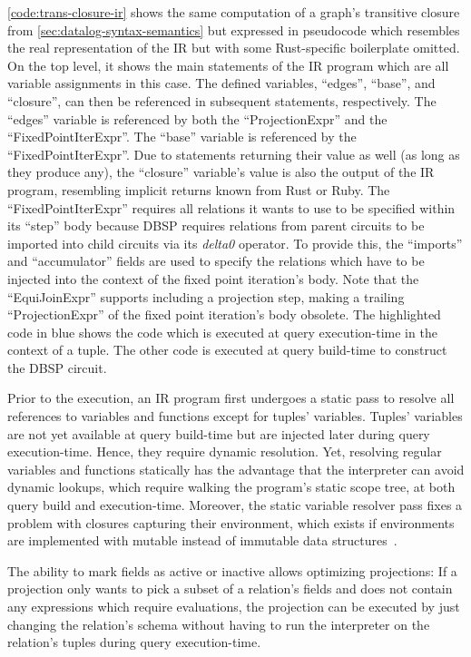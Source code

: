 

\ref{code:trans-closure-ir} shows the same computation of a graph's transitive
closure from \ref{sec:datalog-syntax-semantics} but expressed in pseudocode which
resembles the real representation of the \ac{IR} but with some Rust-specific
boilerplate omitted.
On the top level, it shows the main statements of the \ac{IR} program which
are all variable assignments in this case.
The defined variables, ``edges'', ``base'', and ``closure'', can then be referenced
in subsequent statements, respectively.
The ``edges'' variable is referenced by both the ``ProjectionExpr'' and the
``FixedPointIterExpr''.
The ``base'' variable is referenced by the ``FixedPointIterExpr''.
Due to statements returning their value as well (as long as they produce any),
the ``closure'' variable's value is also the output of the \ac{IR} program,
resembling implicit returns known from Rust or Ruby.
The ``FixedPointIterExpr'' requires all relations it wants to use to be specified
within its ``step'' body because DBSP requires relations from parent circuits
to be imported into child circuits via its \emph{delta0} operator.
To provide this, the ``imports'' and ``accumulator'' fields are used to
specify the relations which have to be injected into the context of the fixed point
iteration's body.
Note that the ``EquiJoinExpr'' supports including a projection step,
making a trailing ``ProjectionExpr'' of the fixed point iteration's body obsolete.
The highlighted code in blue shows the code which is executed at query
execution-time in the context of a tuple.
The other code is executed at query build-time to construct the DBSP circuit.

Prior to the execution, an \ac{IR} program first undergoes a
static pass to resolve all references to variables and functions except for
tuples' variables.
Tuples' variables are not yet available at query build-time but are injected
later during query execution-time. Hence, they require dynamic resolution.
Yet, resolving regular variables and functions statically has the advantage that
the interpreter can avoid dynamic lookups, which require walking the program's
static scope tree, at both query build and execution-time.
Moreover, the static variable resolver pass fixes a problem with closures
capturing their environment, which exists if environments are implemented with
mutable instead of immutable data structures~\cite{nystrom2021crafting}.

The ability to mark fields as active or inactive allows optimizing projections:
If a projection only wants to pick a subset of a relation's fields and does not
contain any expressions which require evaluations, the projection can be executed
by just changing the relation's schema without having to run the interpreter
on the relation's tuples during query execution-time.

